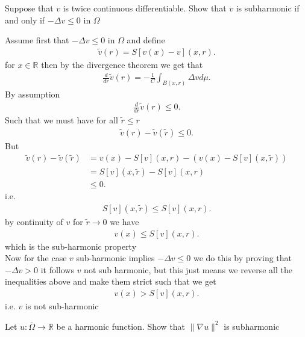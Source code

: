 \newpage
\begin{question}[b]
 Suppose that $v$ is twice continuous differentiable. Show that $v$ is subharmonic if and only 
 if $- \Delta v \le 0$ in $\Omega$
\end{question}
\begin{solution}
 Assume first that $-\Delta v \le 0$ in $\Omega$ and define 
 \begin{align*}
   \tilde{v}(r) = S[v(x)-v](x,r) 
 .\end{align*}
 for $x \in  \mathbb{R}$ then by the divergence theorem we get that 
 \begin{align*}
   \frac{d}{dr}\tilde{v}(r)  =  -\frac{1}{C} \int_{B(x,r)} \Delta v d\mu
 .\end{align*}
 By assumption 
 \begin{align*}
   \frac{d}{dr} \tilde{v}(r)  \le  0
 .\end{align*}
 Such that we must have for all $\tilde{r} \le r $
 \begin{align*}
   \tilde{v}(r) - \tilde{v}(\tilde{r}) \le  0
 .\end{align*}
 But 
 \begin{align*}
   \tilde{v}(r) - \tilde{v}(\tilde{r})  &= v(x) - S[v](x,r) - (v(x) - S[v](x,\tilde{r})) \\
                                          &= S[v](x,\tilde{r}) - S[v](x,r)\\
                                          &\le 0
 .\end{align*}
 i.e. 
 \begin{align*}
   S[v](x,\tilde{r} ) \le  S[v](x,r)
 .\end{align*}
 by continuity of $v$ for $\tilde{r}\to 0$  we have
 \begin{align*}
   v(x) \le S[v](x,r)
 .\end{align*}
 which is the sub-harmonic property \\[1ex]
 Now for the case $v$ sub-harmonic implies $-\Delta v \le 0$ we do this by proving that 
 $-\Delta v > 0 $ it follows $v$ not sub harmonic, but this just means we reverse all the inequalities above and make them strict
 such that we get 
 \begin{align*}
   v(x) > S[v](x,r)
 .\end{align*}
 i.e. $v$ is not sub-harmonic
\end{solution}
\begin{question}[c]
 Let $u : \overline{\Omega } \to  \mathbb{R} $  be a harmonic function. Show that $\|\nabla u\|^2$ is subharmonic
\end{question}
